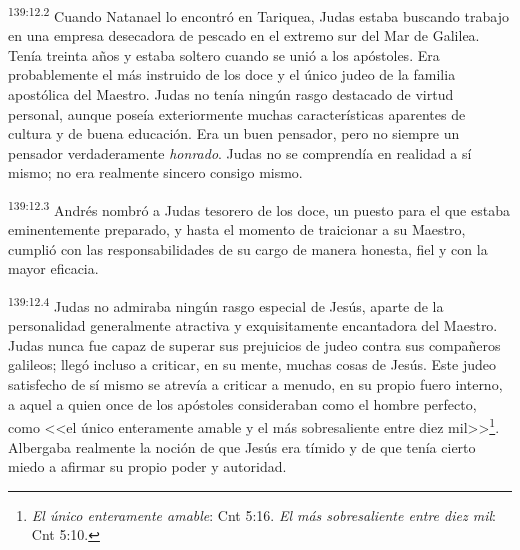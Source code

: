 \par 
\textsuperscript{139:12.2} Cuando Natanael lo encontró en Tariquea, Judas estaba buscando trabajo en una empresa desecadora de pescado en el extremo sur del Mar de Galilea. Tenía treinta años y estaba soltero cuando se unió a los apóstoles. Era probablemente el más instruido de los doce y el único judeo de la familia apostólica del Maestro. Judas no tenía ningún rasgo destacado de virtud personal, aunque poseía exteriormente muchas características aparentes de cultura y de buena educación. Era un buen pensador, pero no siempre un pensador verdaderamente \textit{honrado}. Judas no se comprendía en realidad a sí mismo; no era realmente sincero consigo mismo.

\par 
\textsuperscript{139:12.3} Andrés nombró a Judas tesorero de los doce, un puesto para el que estaba eminentemente preparado, y hasta el momento de traicionar a su Maestro, cumplió con las responsabilidades de su cargo de manera honesta, fiel y con la mayor eficacia.

\par 
\textsuperscript{139:12.4} Judas no admiraba ningún rasgo especial de Jesús, aparte de la personalidad generalmente atractiva y exquisitamente encantadora del Maestro. Judas nunca fue capaz de superar sus prejuicios de judeo contra sus compañeros galileos; llegó incluso a criticar, en su mente, muchas cosas de Jesús. Este judeo satisfecho de sí mismo se atrevía a criticar a menudo, en su propio fuero interno, a aquel a quien once de los apóstoles consideraban como el hombre perfecto, como <<el único enteramente amable y el más sobresaliente entre diez mil>>\footnote{\textit{El único enteramente amable}: Cnt 5:16. \textit{El más sobresaliente entre diez mil}: Cnt 5:10.}. Albergaba realmente la noción de que Jesús era tímido y de que tenía cierto miedo a afirmar su propio poder y autoridad.

